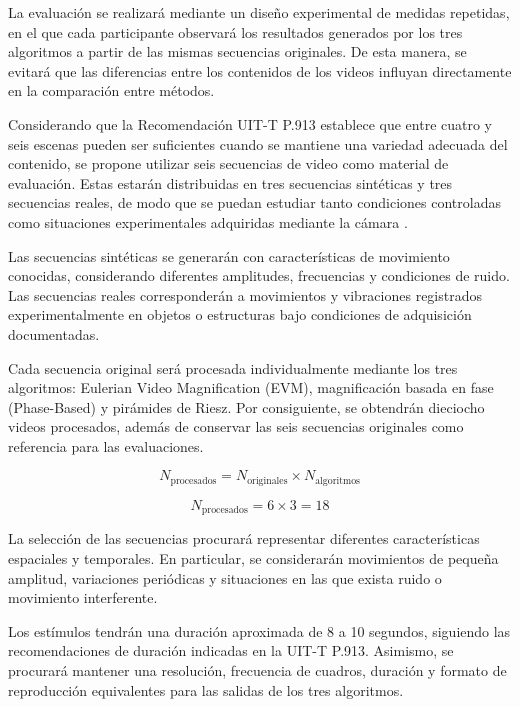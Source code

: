 La evaluación se realizará mediante un diseño experimental de medidas repetidas, en el que cada participante observará los resultados generados por los tres algoritmos a partir de las mismas secuencias originales. De esta manera, se evitará que las diferencias entre los contenidos de los videos influyan directamente en la comparación entre métodos.

Considerando que la Recomendación UIT-T P.913 establece que entre cuatro y seis escenas pueden ser suficientes cuando se mantiene una variedad adecuada del contenido, se propone utilizar seis secuencias de video como material de evaluación. Estas estarán distribuidas en tres secuencias sintéticas y tres secuencias reales, de modo que se puedan estudiar tanto condiciones controladas como situaciones experimentales adquiridas mediante la cámara \cite{P9132021}.

Las secuencias sintéticas se generarán con características de movimiento conocidas, considerando diferentes amplitudes, frecuencias y condiciones de ruido. Las secuencias reales corresponderán a movimientos y vibraciones registrados experimentalmente en objetos o estructuras bajo condiciones de adquisición documentadas.

Cada secuencia original será procesada individualmente mediante los tres algoritmos: Eulerian Video Magnification (EVM), magnificación basada en fase (Phase-Based) y pirámides de Riesz. Por consiguiente, se obtendrán dieciocho videos procesados, además de conservar las seis secuencias originales como referencia para las evaluaciones.

\begin{equation}
N_{\mathrm{procesados}} =
N_{\mathrm{originales}}\times N_{\mathrm{algoritmos}}
\end{equation}

\begin{equation}
N_{\mathrm{procesados}}=6\times3=18
\end{equation}

La selección de las secuencias procurará representar diferentes características espaciales y temporales. En particular, se considerarán movimientos de pequeña amplitud, variaciones periódicas y situaciones en las que exista ruido o movimiento interferente.

Los estímulos tendrán una duración aproximada de 8 a 10 segundos, siguiendo las recomendaciones de duración indicadas en la UIT-T P.913. Asimismo, se procurará mantener una resolución, frecuencia de cuadros, duración y formato de reproducción equivalentes para las salidas de los tres algoritmos.

